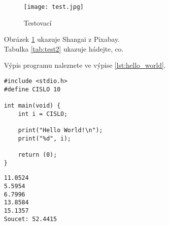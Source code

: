 \documentclass[12pt]{report}
\begin{document}
\begin{figure}
  \texttt{[image: test.jpg]}
  \caption{Testovací}
  \label{fig:test}
\end{figure}
Obrázek \ref{fig:test} ukazuje Shangai z Pixabay.\\
Tabulka \ref{tab:test2} ukazuje hádejte, co.
	
\lipsum[3]


Výpis programu   naleznete ve výpise \ref{lst:hello_world}.

\begin{lstlisting}[title={Program hello.c}, caption={hello.c}, label={lst:hello_world}]
#include <stdio.h>
#define CISLO 10

int main(void) {
	int i = CISLO;

	print("Hello World!\n");
	print("%d", i);

	return (0);
}
\end{lstlisting}

\lipsum[1]	

\begin{lstlisting}[numbers=none, title={Příklad výstupního souboru}]
11.0524
5.5954
6.7996
13.8584
15.1357
Soucet: 52.4415
\end{lstlisting}
\end{document}
